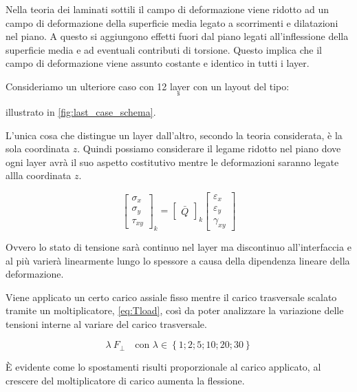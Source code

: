 \documentclass[a4paper,num-refs]{oup-contemporary}
\begin{document}
Nella teoria dei laminati sottili il campo di deformazione viene ridotto ad un campo di deformazione della superficie media legato a scorrimenti e dilatazioni nel piano. A questo si aggiungono effetti fuori dal piano legati all'inflessione della superficie media e ad eventuali contributi di torsione. Questo implica che il campo di deformazione viene assunto costante e identico in tutti i layer.

Consideriamo un ulteriore caso con 12 layer con un layout del tipo:
\begin{equation}
	[10 /-10 / 30 /-30 / 0_2]_{\mathrm{s}}
\end{equation}

illustrato in \cref{fig:last_case_schema}. 

L'unica cosa che distingue un layer dall'altro, secondo la teoria considerata, è la sola coordinata $z$. Quindi possiamo considerare il legame ridotto nel piano dove ogni layer avrà  il suo aspetto costitutivo mentre le deformazioni saranno legate allla coordinata $z$. 

\begin{equation}
	\begin{bmatrix}
		\sigma_x\\ \sigma_y\\ \tau_{xy}
	\end{bmatrix}_k=
\begin{bmatrix}
	\bar Q
\end{bmatrix}_k \begin{bmatrix} \varepsilon_x\\ \varepsilon_y\\ \gamma_{xy} \end{bmatrix}
\end{equation}

Ovvero lo stato di tensione sarà continuo nel layer ma discontinuo all'interfaccia e al più varierà linearmente lungo lo spessore a causa della dipendenza lineare della deformazione. 

Viene applicato un certo carico assiale fisso mentre il carico trasversale scalato tramite un moltiplicatore, \cref{eq:Tload}, così da poter analizzare la variazione delle tensioni interne al variare del carico trasversale. 

\begin{equation}
	\lambda \:F_{\perp} \quad \text{con } \lambda \in \left\{1; 2; 5;10;20;30\right\}
	\label{eq:Tload}
\end{equation}

È evidente come lo spostamenti risulti proporzionale al carico applicato, al crescere del moltiplicatore di carico aumenta la flessione. 
\end{document}
